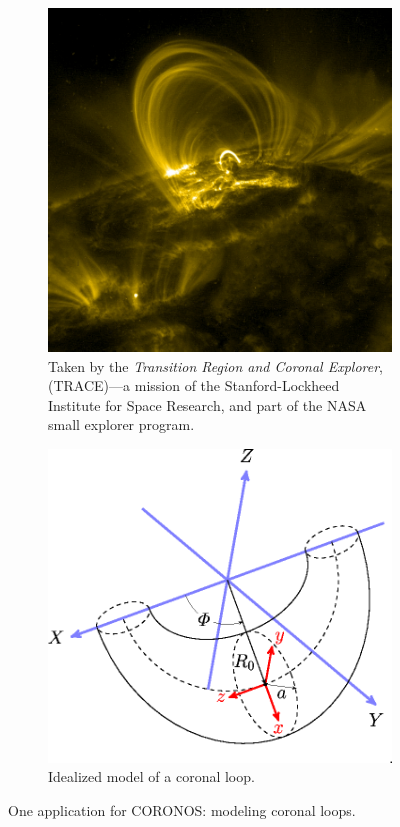 \documentclass[12pt, letterpaper, oneside, leqno, openright]{memoir}
\newcommand{\coronos}{\textsf{CORONOS}}
\begin{document}
  \begin{figure}[ht]
    \centering
    \begin{subfigure}[t]{0.45\textwidth}
       \includegraphics[scale=0.23]{figonea.jpg}
       \caption{ Taken by the {\em Transition Region and Coronal Explorer},
                 (TRACE)---a mission of the Stanford-Lockheed Institute for 
                 Space Research, and part of the NASA small explorer program.
                 \label{fig:figonea}
               }
    \end{subfigure}
%
    \hspace {0.05\textwidth}
%
    \begin{subfigure}[t]{0.45\textwidth}
       \includegraphics[scale=0.80]{figoneb.eps}
       \caption{Idealized model of a coronal loop.
                \label{fig:figoneb}
               }
    \end{subfigure}
%
    \caption{One application for \coronos: modeling coronal loops.
                \label{fig:figone}}
  \end{figure}
\end{document}
